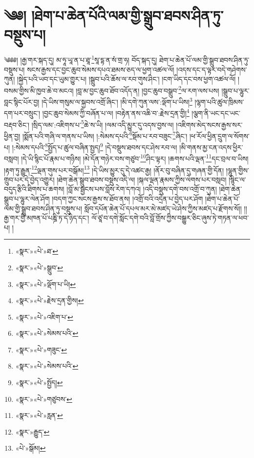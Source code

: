 \chapter{༄༅། །ཐེག་པ་ཆེན་པོའི་ལམ་གྱི་སྒྲུབ་ཐབས་ཤིན་ཏུ་བསྡུས་པ།}༄༅༅། །རྒྱ་གར་སྐད་དུ། མ་ཧཱ་ཡཱ་ན་པ་ཐཱ་\footnote{«སྣར་»«པེ་»ཐ་}སཱ་དྷ་ན་སཾ་གྲ་ཧ། བོད་སྐད་དུ། ཐེག་པ་ཆེན་པོ་ལམ་གྱི་སྒྲུབ་ཐབས་ཤིན་ཏུ་བསྡུས་པ། སངས་རྒྱས་དང་བྱང་ཆུབ་སེམས་དཔའ་ཐམས་ཅད་ལ་ཕྱག་འཚལ་ལོ། །འདས་དང་ད་ལྟར་བདེ་གཤེགས་ཀུན། །སྐྱེད་པའི་ཡབ་དང་ཡུམ་གྱུར་པ། །སྒྲུབ་པའི་ཆོས་ལ་རབ་གུས་ཤིང་། །ངག་ཡིད་དང་བས་ཕྱག་འཚལ་ལོ། །བསམ་གྱིས་མི་ཁྱབ་ཆེ་བ་མངའ། །བླ་མ་བྱང་ཆུབ་ཐོབ་འདོད་ན། །བྱང་ཆུབ་བསྒྲུབ་\footnote{«སྣར་»«པེ་»སྒྲུབ་}ལ་རག་ལས་པས། །སྒྲུབ་པ་ལྷུར་བླང་སྙིང་པོར་བྱ། །དེ་ཡིས་གསུམ་ལ་སྐྱབས་འགྲོ་ཞིང་། །མི་དགེ་ཀུན་ལས་:ལྡོག་པ་ཡིས།\footnote{«སྣར་»«པེ་»ལྡོག་པ་ཡི།} །ལྷག་པའི་ཚུལ་ཁྲིམས་དག་པར་བསྲུང་། །བྱང་ཆུབ་སེམས་ཀྱི་བཞོན་པ་ལ། །བརྟེན་ནས་འཆི་བ་:རྗེས་དྲན་གྱི།\footnote{«སྣར་»«པེ་»རྗེས་དྲན་གྱིས།} །ལྕག་ནི་ཡང་དང་ཡང་བརྡབ་ཅིང་། །སྲིད་ལམ་:འཇིགས་པ་\footnote{«སྣར་»«པེ་»འཇིག་པ་}ཆེ་ས་ཡི། །ལམ་འདི་མྱུར་དུ་འདས་བྱས་ལ། །འཇིགས་མེད་སངས་རྒྱས་སར་ཕྱིན་བྱ། །སྨོན་པའི་གཞི་ལ་གནས་པ་ཡིས། །:སེམས་དཔའི་\footnote{«སྣར་»«པེ་»སེམས་པའི་}སྡོམ་པ་རབ་བཟུང་\footnote{«སྣར་»«པེ་»གཟུང་}ཞིང་། །ཕ་རོལ་ཕྱིན་དྲུག་ལ་སོགས་པ། །:སེམས་དཔའི་\footnote{«སྣར་»«པེ་»སེམས་པའི་}སྤྱོད་པ་ཚུལ་བཞིན་སྤྱད།\footnote{«སྣར་»«པེ་»སྤྱོད།} །དེ་བསྡུས་ཐབས་དང་ཤེས་རབ་ལ། །མི་གནས་མྱ་ངན་འདས་ཕྱིར་བསླབ། །དེ་ཡི་སྙིང་པོ་རྣམ་པ་གཉིས། །མེ་དོན་གཉེར་བས་གཙུབ་\footnote{«སྣར་»«པེ་»གཙུབས་}ཤིང་ལྟར། །ཆགས་པའི་ལྡན་\footnote{«སྣར་»«པེ་»རླན་}དང་བྲལ་བ་ཡིས། །རྟག་ཏུ་རྒྱུན་\footnote{«སྣར་»རྒྱུད་}ལྡན་གུས་པར་བསྒོམ།\footnote{«པེ་»སྒོམ།} །དེ་ཡིས་མྱུར་དུ་དེ་འཚང་རྒྱ། །ནོར་བུ་བཞིན་དུ་གཞན་གྱི་དོན། །ལྷུན་གྱིས་གྲུབ་པར་དེ་བྱེད་འགྱུར། །ཐེག་ཆེན་སྒྲུབ་ཐབས་བསྡུས་འདི་ལ། །སྐལ་ལྡན་རྣམས་ཀྱིས་ལེགས་པར་བསླབ། །སྙིང་ལ་བདུད་རྩིའི་ཐིགས་པ་ཆགས། །བློ་མ་སྦྱངས་པས་བློས་རེག་དཀའ། །འདི་བསྡུས་དགེ་བས་འགྲོ་བ་ཀུན། །ཐེག་ཆེན་སྒྲུབ་པ་ལྷུར་ལེན་ཤོག །བདག་ཀྱང་སངས་རྒྱས་ས་ཐོབ་ནས། །འགྲོ་བའི་འདྲེན་པ་བྱེད་པར་ཤོག །ཐེག་པ་ཆེན་པོ་ལམ་གྱི་སྒྲུབ་ཐབས་ཤིན་ཏུ་བསྡུས་པ། སློབ་དཔོན་ཆེན་པོ་དཔལ་མར་མེ་མཛད་ཡེ་ཤེས་ཀྱིས་མཛད་པ་རྫོགས་སོ།། །།རྒྱ་གར་གྱི་མཁན་པོ་པཎྜི་ཏ་དེ་ཉིད་དང་། ལོ་ཙཱ་བ་དགེ་སློང་དགེ་བའི་བློ་གྲོས་ཀྱིས་བསྒྱུར་ཅིང་ཞུས་ཏེ་གཏན་ལ་ཕབ་པ། ། 